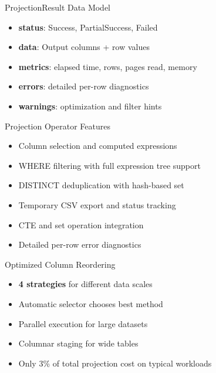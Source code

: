 \documentclass{beamer}
\begin{document}
\begin{frame}{ProjectionResult Data Model}
  \begin{itemize}
    \item \textbf{status}: Success, PartialSuccess, Failed
    \item \textbf{data}: Output columns + row values
    \item \textbf{metrics}: elapsed time, rows, pages read, memory
    \item \textbf{errors}: detailed per-row diagnostics
    \item \textbf{warnings}: optimization and filter hints
  \end{itemize}

  \vspace{0.4cm}
\end{frame}

\begin{frame}{Projection Operator Features}
  \begin{itemize}
    \item Column selection and computed expressions
    \item WHERE filtering with full expression tree support
    \item DISTINCT deduplication with hash-based set
    \item Temporary CSV export and status tracking
    \item CTE and set operation integration
    \item Detailed per-row error diagnostics
  \end{itemize}
\end{frame}

\begin{frame}{Optimized Column Reordering}
  \begin{itemize}
    \item \textbf{4 strategies} for different data scales
    \item Automatic selector chooses best method
    \item Parallel execution for large datasets
    \item Columnar staging for wide tables
    \item Only 3\% of total projection cost on typical workloads
  \end{itemize}
\end{frame}
\end{document}
